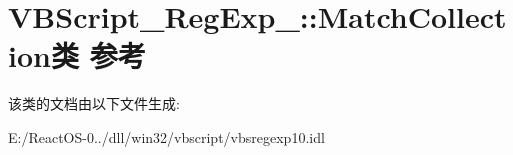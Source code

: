 \hypertarget{class_v_b_script___reg_exp__10_1_1_match_collection}{}\section{V\+B\+Script\+\_\+\+Reg\+Exp\+\_\+:\+:Match\+Collection类 参考}
\label{class_v_b_script___reg_exp__10_1_1_match_collection}


该类的文档由以下文件生成\+:\begin{DoxyCompactItemize}
\item 
E\+:/\+React\+O\+S-\/0../dll/win32/vbscript/vbsregexp10.\+idl\end{DoxyCompactItemize}
